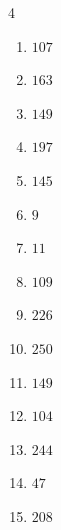 \begin{multicols}{4}
\begin{enumerate}

  \item $107$


  \item $163$


  \item $149$


  \item $197$


  \item $145$


  \item $9$


  \item $11$


  \item $109$


  \item $226$


\columnbreak %

  \item $250$


  \item $149$


  \item $104$


  \item $244$


  \item $47$


  \item $208$



\end{enumerate}
\end{multicols}
